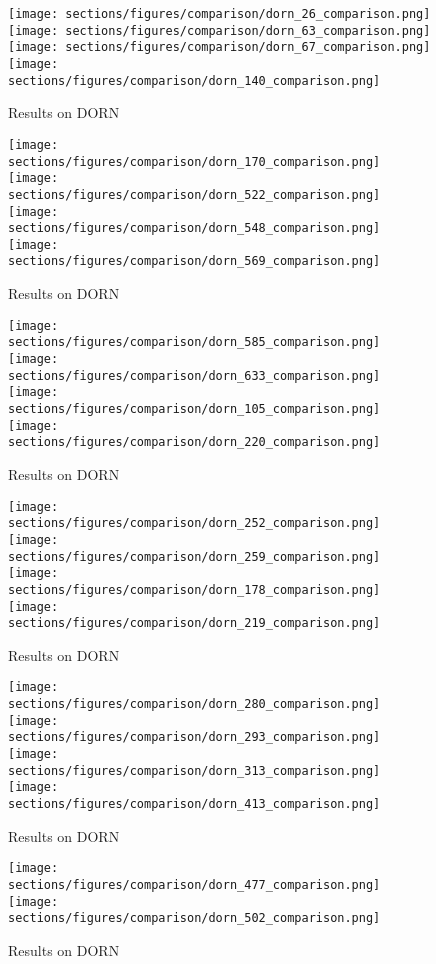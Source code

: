 \begin{figure*}
  \texttt{[image: sections/figures/comparison/dorn\_26\_comparison.png]}
  \texttt{[image: sections/figures/comparison/dorn\_63\_comparison.png]}
  \texttt{[image: sections/figures/comparison/dorn\_67\_comparison.png]}
  \texttt{[image: sections/figures/comparison/dorn\_140\_comparison.png]}
  \caption{Results on DORN}
\end{figure*}
\begin{figure*}
  \texttt{[image: sections/figures/comparison/dorn\_170\_comparison.png]}
  \texttt{[image: sections/figures/comparison/dorn\_522\_comparison.png]}
  \texttt{[image: sections/figures/comparison/dorn\_548\_comparison.png]}
  \texttt{[image: sections/figures/comparison/dorn\_569\_comparison.png]}
  \caption{Results on DORN}
\end{figure*}
\begin{figure*}
  \texttt{[image: sections/figures/comparison/dorn\_585\_comparison.png]}
  \texttt{[image: sections/figures/comparison/dorn\_633\_comparison.png]}
  \texttt{[image: sections/figures/comparison/dorn\_105\_comparison.png]}
  \texttt{[image: sections/figures/comparison/dorn\_220\_comparison.png]}
  \caption{Results on DORN}
\end{figure*}
\begin{figure*}
  \texttt{[image: sections/figures/comparison/dorn\_252\_comparison.png]}
  \texttt{[image: sections/figures/comparison/dorn\_259\_comparison.png]}
  \texttt{[image: sections/figures/comparison/dorn\_178\_comparison.png]}
  \texttt{[image: sections/figures/comparison/dorn\_219\_comparison.png]}
  \caption{Results on DORN}
\end{figure*}
\begin{figure*}
  \texttt{[image: sections/figures/comparison/dorn\_280\_comparison.png]}
  \texttt{[image: sections/figures/comparison/dorn\_293\_comparison.png]}
  \texttt{[image: sections/figures/comparison/dorn\_313\_comparison.png]}
  \texttt{[image: sections/figures/comparison/dorn\_413\_comparison.png]}
  \caption{Results on DORN}
\end{figure*}
\begin{figure*}
  \texttt{[image: sections/figures/comparison/dorn\_477\_comparison.png]}
  \texttt{[image: sections/figures/comparison/dorn\_502\_comparison.png]}
  \caption{Results on DORN}
\end{figure*}
